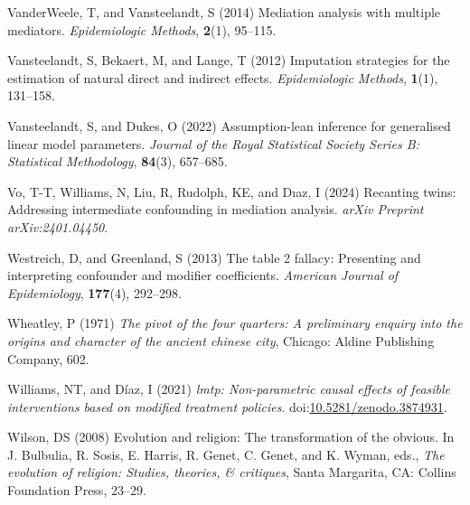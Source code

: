 \documentclass[
  single column]{article}
\newlength{\cslhangindent}
\newenvironment{CSLReferences}[2] %
 {\begin{list}{}{%
  \setlength{\itemindent}{0pt}
  \setlength{\leftmargin}{0pt}
  \setlength{\parsep}{0pt}
  \ifodd #1
   \setlength{\leftmargin}{\cslhangindent}
   \setlength{\itemindent}{-1\cslhangindent}
  \fi
  \setlength{\itemsep}{#2\baselineskip}}}
 {\end{list}}
\begin{document}
\begin{CSLReferences}{1}{0}
VanderWeele, T, and Vansteelandt, S (2014) Mediation analysis with
multiple mediators. \emph{Epidemiologic Methods}, \textbf{2}(1),
95--115.

Vansteelandt, S, Bekaert, M, and Lange, T (2012) Imputation strategies
for the estimation of natural direct and indirect effects.
\emph{Epidemiologic Methods}, \textbf{1}(1), 131--158.

Vansteelandt, S, and Dukes, O (2022) Assumption-lean inference for
generalised linear model parameters. \emph{Journal of the Royal
Statistical Society Series B: Statistical Methodology}, \textbf{84}(3),
657--685.

Vo, T-T, Williams, N, Liu, R, Rudolph, KE, and Dıaz, I (2024) Recanting
twins: Addressing intermediate confounding in mediation analysis.
\emph{arXiv Preprint arXiv:2401.04450}.

Westreich, D, and Greenland, S (2013) The table 2 fallacy: Presenting
and interpreting confounder and modifier coefficients. \emph{American
Journal of Epidemiology}, \textbf{177}(4), 292--298.

Wheatley, P (1971) \emph{The pivot of the four quarters: A preliminary
enquiry into the origins and character of the ancient chinese city},
Chicago: Aldine Publishing Company, 602.

Williams, NT, and Díaz, I (2021) \emph{{l}mtp: Non-parametric causal
effects of feasible interventions based on modified treatment policies}.
doi:\href{https://doi.org/10.5281/zenodo.3874931}{10.5281/zenodo.3874931}.

Wilson, DS (2008) Evolution and religion: The transformation of the
obvious. In J. Bulbulia, R. Sosis, E. Harris, R. Genet, C. Genet, and K.
Wyman, eds., \emph{The evolution of religion: Studies, theories, \&
critiques}, Santa Margarita, CA: Collins Foundation Press, 23--29.

\end{CSLReferences}
\end{document}
